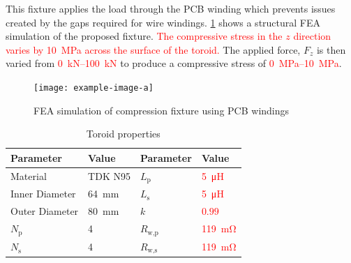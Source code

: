 \documentclass[conference]{IEEEtran}
\begin{document}
This fixture applies the load through the PCB winding which prevents issues created by the gaps required for wire windings. 
\cref{fig:fixturefea} shows a structural FEA simulation of the proposed fixture. 
\textcolor{red}{The compressive stress in the $z$ direction varies by \SI{10}{\mega\pascal} across the surface of the toroid.}
The applied force, $F_z$ is then varied from \textcolor{red}{\SIrange{0}{100}{\kilo\newton}} to produce a compressive stress of \textcolor{red}{\SIrange{0}{10}{\mega\pascal}}.

\begin{figure}[t]
  \centering 
  \texttt{[image: example-image-a]}
  \caption{FEA simulation of compression fixture using PCB windings}
  \label{fig:fixturefea}
\end{figure}

\begin{table}
  \centering
  \caption{Toroid properties}
  \begin{tabular}{@{}llll@{}}
    \toprule
    Parameter & Value & Parameter & Value \\ \midrule
    Material & TDK N95 & $L_\text{p}$ & \textcolor{red}{\SI{5}{\micro\henry}} \\
    Inner Diameter & \SI{64}{\milli\meter} & $L_\text{s}$ & \textcolor{red}{\SI{5}{\micro\henry}} \\
    Outer Diameter & \SI{80}{\milli\meter} & $k$ & \textcolor{red}{$0.99$} \\
    $N_\text{p}$ & 4 & $R_\text{w,p}$ & \textcolor{red}{\SI{119}{\milli\ohm}} \\
    $N_\text{s}$ & 4 & $R_\text{w,s}$ & \textcolor{red}{\SI{119}{\milli\ohm}} \\
    \bottomrule
  \end{tabular}
  \label{tab:toroidproperties}
\end{table}
\end{document}
